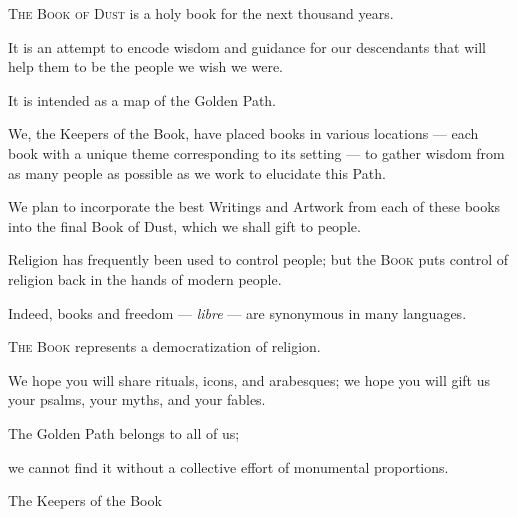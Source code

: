 \begin{multicols}{2}
\bverse \textsc{The Book of Dust} is a holy book for the next thousand years.

\bverse It is an attempt to encode wisdom and guidance for our descendants that will help them to be the people we wish we were.

\bverse It is intended as a map of the Golden Path.

\bverse We, the Keepers of the Book, have placed books in various locations --- each book with a unique theme corresponding to its setting --- to gather wisdom from as many people as possible as we work to elucidate this Path.

\bverse We plan to incorporate the best Writings and Artwork from each of these books into the final Book of Dust, which we shall gift to people.

\bverse Religion has frequently been used to control people; but the \textsc{Book} puts control of religion back in the hands of modern people.

\bverse Indeed, books and freedom --- \textit{libre} --- are synonymous in many languages.

\bverse\textsc{The Book} represents a democratization of religion.

\bverse We hope you will share rituals, icons, and arabesques; we hope you will gift us your psalms, your myths, and your fables.

\bverse The Golden Path belongs to all of us;

\bverse we cannot find it without a collective effort of monumental proportions.
\bigskip
\begin{flushright}
The Keepers of the Book
\end{flushright}
\end{multicols}